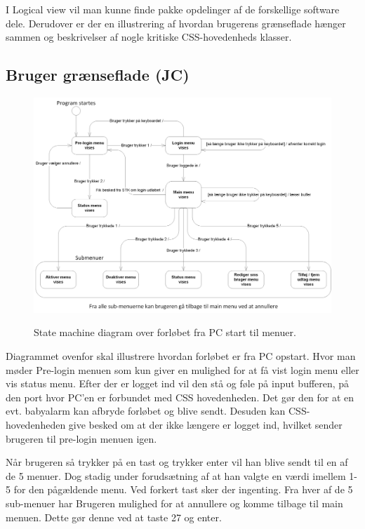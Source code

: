 I Logical view vil man kunne finde pakke opdelinger af de forskellige software dele. Derudover er der en illustrering af hvordan brugerens grænseflade hænger sammen og beskrivelser af nogle kritiske CSS-hovedenheds klasser.

\subsection{Bruger grænseflade (JC)}

\begin{figure}[!htb]
     {\includegraphics[width=\textwidth]{billeder/uml/state_machine_main}}
     \caption{State machine diagram over forløbet fra PC start til menuer.}
     \label{fig:State_machine_pc}
\end{figure}

Diagrammet ovenfor skal illustrere hvordan forløbet er fra PC opstart. Hvor man møder Pre-login menuen som kun giver en mulighed for at få vist login menu eller vis status menu. Efter der er logget ind vil den stå og føle på input bufferen, på den port hvor PC'en er forbundet med CSS hovedenheden. Det gør den for at en evt. babyalarm kan afbryde forløbet og blive sendt. Desuden kan CSS-hovedenheden give besked om at der ikke længere er logget ind, hvilket sender brugeren til pre-login menuen igen.

\medskip

Når brugeren så trykker på en tast og trykker enter vil han blive sendt til en af de 5 menuer. Dog stadig under forudsætning af at han valgte en værdi imellem 1-5 for den pågældende menu. Ved forkert tast sker der ingenting. Fra hver af de 5 sub-menuer har Brugeren mulighed for at annullere og komme tilbage til main menuen. Dette gør denne ved at taste 27 og enter.


